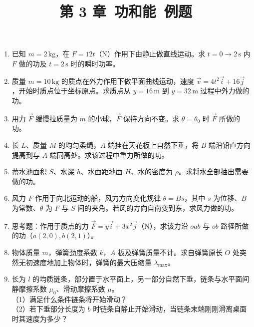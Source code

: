 \documentclass[12pt]{article}
\title{第 3 章\ 功和能\ 例题}
\author{}
\date{}
\begin{document}
\maketitle

\begin{enumerate}[label=\textbf{例\arabic*.}, leftmargin=*]

\item 已知 $m = 2\,\mathrm{kg}$，在 $F = 12t$（N）作用下由静止做直线运动。求 $t = 0 \to 2\,\mathrm{s}$ 内 $F$ 做的功及 $t = 2\,\mathrm{s}$ 时的瞬时功率。

\item 质量 $m = 10\,\mathrm{kg}$ 的质点在外力作用下做平面曲线运动，速度 $\vec{v} = 4t^2\vec{i} + 16\vec{j}$，开始时质点位于坐标原点。求质点从 $y = 16\,\mathrm{m}$ 到 $y = 32\,\mathrm{m}$ 过程中外力做的功。

\item 用力 $\vec{F}$ 缓慢拉质量为 $m$ 的小球，$\vec{F}$ 保持方向不变。求 $\theta = \theta_0$ 时 $\vec{F}$ 所做的功。

\item 长 $L$、质量 $M$ 的均匀柔绳，$A$ 端挂在天花板上自然下垂，将 $B$ 端沿铅直方向提高到与 $A$ 端同高处。求该过程中重力所做的功。

\item 蓄水池面积 $S$、水深 $h$、水面距地面 $H$、水的密度为 $\rho$。求将水全部抽出需要做的功。

\item 风力 $F$ 作用于向北运动的船，风力方向变化规律 $\theta = Bs$，其中 $s$ 为位移、$B$ 为常数、$\theta$ 为 $F$ 与 $S$ 间的夹角。若风的方向自南变到东，求风力做的功。

\item 思考题：作用于质点的力 $\vec{F} = y\vec{i} + 3x^2\vec{j}$（N），求该力沿 $oab$ 与 $ob$ 路径所做的功（$a(2,0), b(2,1)$）。

\item 物体质量 $m$，弹簧劲度系数 $k$，$A$ 板及弹簧质量不计。求自弹簧原长 $O$ 处突然无初速度地加上物体时，弹簧的最大压缩量 $\lambda_{\max}$。

\item 长为 $l$ 的均质链条，部分置于水平面上，另一部分自然下垂，链条与水平面间静摩擦系数 $\mu_0$、滑动摩擦系数 $\mu$。\\
（1）满足什么条件链条将开始滑动？\\
（2）若下垂部分长度为 $b$ 时链条自静止开始滑动，当链条末端刚刚滑离桌面时其速度为多少？


\end{enumerate}
\end{document}

